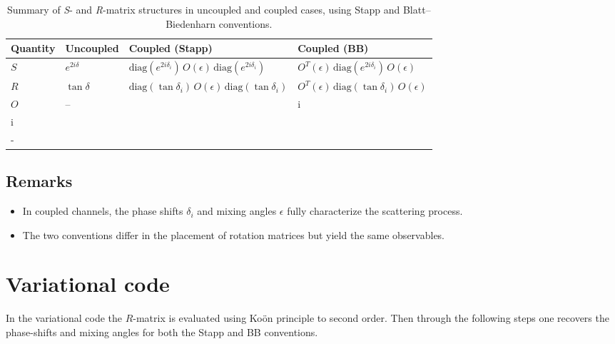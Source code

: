 \documentclass[10pt,a4paper]{article}
\begin{document}
	\begin{table}[h!]
		\centering
		\renewcommand{\arraystretch}{1.5}
		\begin{tabular}{| >{\centering\arraybackslash}m{2.5cm} | >{\centering\arraybackslash}m{2cm} | >{\centering\arraybackslash}m{5cm} | >{\centering\arraybackslash}m{5cm} |}
			\hline
			\textbf{Quantity} & \textbf{Uncoupled} & \textbf{Coupled (Stapp)} & \textbf{Coupled (BB)} \\
			\hline
			$S$ & 
			$e^{2i\delta}$ &  $\mathrm{diag}(e^{2i\delta_i})\,O(\epsilon) \,\mathrm{diag}(e^{2i\delta_i}) $ & 
			$O^T(\epsilon) \, \mathrm{diag}(e^{2i\delta_i}) \, O(\epsilon)$ \\
			\hline
			$R$ & 
			$\tan\delta$ & 
			$\mathrm{diag}(\tan\delta_i)\,
			O(\epsilon) \, \mathrm{diag}(\tan\delta_i)$ & 
			$O^T(\epsilon) \, \mathrm{diag}(\tan\delta_i) \, O(\epsilon)$ \\
			\hline
			$O$ & 
			-- & 
			\( O(\epsilon) = \begin{pmatrix} \cos2\epsilon & i\sin2\epsilon \\ i\sin2\epsilon & \cos2\epsilon \end{pmatrix} \) & 
			\( O(\epsilon) = \begin{pmatrix} \cos \epsilon & \sin \epsilon \\ -\sin \epsilon & \cos \epsilon \end{pmatrix} \) \\
			\hline
		\end{tabular}
		\caption{Summary of \textit{S}- and \textit{R}-matrix structures in uncoupled and coupled cases, using Stapp \cite{Stapp} and Blatt--Biedenharn \cite{BB} conventions.}
		\label{tab:s_r_matrices}
	\end{table}
	
	\subsection{Remarks}
	
	\begin{itemize}
		\item In coupled channels, the phase shifts \( \delta_i \) and mixing angles \( \epsilon \) fully characterize the scattering process.
		\item The two conventions differ in the placement of rotation matrices but yield the same observables.
	\end{itemize}
	
	
	\section{Variational code}
	In the variational code the $R$-matrix is evaluated using Ko\"on principle to second order. Then through the following steps one recovers the phase-shifts and mixing angles for both the Stapp and BB conventions.
	
\end{document}
